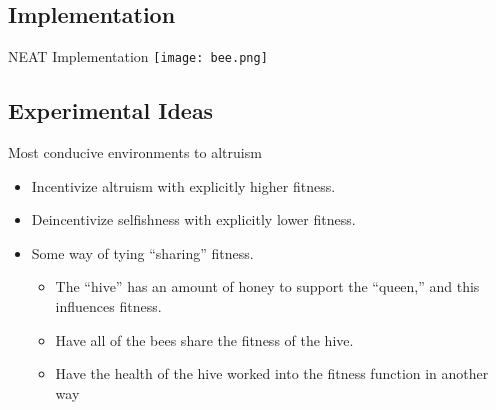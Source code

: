 \documentclass{beamer}
\begin{document}
    \subsection{Implementation}
    \begin{frame}{NEAT Implementation}
        \texttt{[image: bee.png]}
    \end{frame}

    
    \subsection{Experimental Ideas}
    \begin{frame}{Most conducive environments to altruism}
        \begin{itemize}
            \item Incentivize altruism with explicitly higher fitness.
            \item Deincentivize selfishness with explicitly lower fitness.

            \item Some way of tying ``sharing'' fitness.
            \begin{itemize}
                \item The ``hive'' has an amount of honey to support the ``queen,'' and this 
                      influences fitness.
                \item Have all of the bees share the fitness of the hive.
                \item Have the health of the hive worked into the fitness function in another way
            \end{itemize}
        \end{itemize}
    \end{frame}
\end{document}
